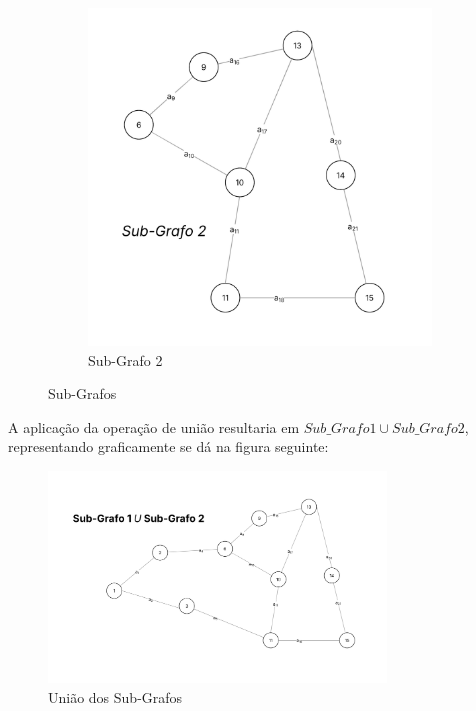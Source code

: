 \documentclass[
12pt,
a4paper,
semrecuonosumario,
sumario = abnt-6027-2012]{report}
\begin{document}
\begin{figure}[!htb]
\begin{subfigure}[b]{0.48\textwidth}
                \includegraphics[width=\textwidth]{figuras/subgrafos/subgrafo2.png} %
                \caption{Sub-Grafo 2}
                \label{fig:imagem2}
            \end{subfigure}

            \caption{Sub-Grafos}
            \label{fig:duasFiguras}
        \end{figure}

    A aplicação da operação de união resultaria em $Sub\_Grafo1 \cup Sub\_Grafo2$, representando graficamente se dá na figura seguinte:

    \begin{figure}
        \centering
        \includegraphics[width=0.8\textwidth]{figuras/subgrafos/subgrafo1usubgrafo2.png}
        \caption{União dos Sub-Grafos}
        \label{fig:uniaoGrafos}
    \end{figure}
\end{document}
